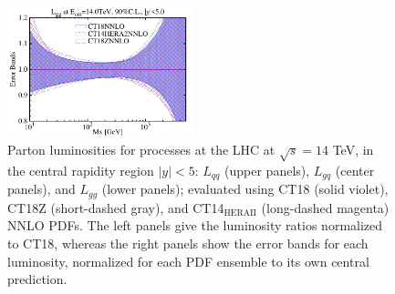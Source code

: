 \begin{widetext}
\begin{figure}[!htbp]
\begin{center}
		\includegraphics[width=0.48\textwidth]{./fig/gg_CT18_err.pdf}
	\end{center}
	\vspace{-2ex}
	\caption{
		Parton luminosities for processes
		at the LHC at $\sqrt{s} = 14$ TeV, in the central
                rapidity region $|y|<5$: $L_{qq}$ (upper panels), $L_{gq}$ (center panels),
		and $L_{gg}$ (lower panels); evaluated using CT18 (solid violet), CT18Z (short-dashed
		gray), and CT14$_\mathrm{HERAII}$ (long-dashed magenta) NNLO PDFs. The left panels give
		the luminosity ratios normalized to CT18, whereas the right panels show the error bands for
		each luminosity, normalized for each PDF ensemble to
                its own central prediction. 
	}
\label{fig:lumia}
\end{figure}

\end{widetext}

